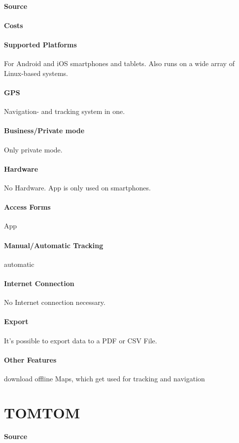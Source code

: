 \paragraph{Source} 
\paragraph{Costs} 
\paragraph{Supported Platforms} For Android and  iOS smartphones and tablets. Also runs on a wide array of Linux-based systems.
\paragraph{GPS} Navigation- and tracking  system in one.
\paragraph{Business/Private mode} Only private mode.
\paragraph{Hardware} No Hardware. App is only used on smartphones.
\paragraph{Access Forms} App
\paragraph{Manual/Automatic Tracking} automatic
\paragraph{Internet Connection} No Internet connection necessary.
\paragraph{Export} It’s possible to export data to a PDF or CSV File.
\paragraph{Other Features} download offline Maps, which get used for tracking and navigation
\newpage
\section{TOMTOM}
\paragraph{Source} 
